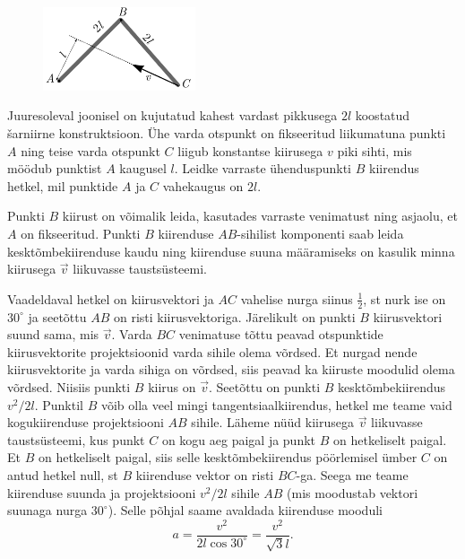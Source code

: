 
\begin{figure}
	\vspace{-10pt}
	\includegraphics[width = 0.4\textwidth] {2017-lahg-10-delta.pdf}
\end{figure}

Juuresoleval joonisel on kujutatud kahest vardast pikkusega $2l$ koostatud \v sarniirne konstruktsioon. Ühe varda otspunkt on fikseeritud liikumatuna punkti $A$ ning teise varda otspunkt $C$ liigub konstantse kiirusega $v$ piki sihti, mis möödub punktist $A$ kaugusel $l$. Leidke varraste ühenduspunkti $B$ kiirendus hetkel, mil punktide $A$ ja $C$ vahekaugus on $2l$.

\hint
Punkti $B$ kiirust on võimalik leida, kasutades varraste venimatust ning asjaolu, et $A$ on fikseeritud. Punkti $B$ kiirenduse $AB$-sihilist komponenti saab leida kesktõmbekiirenduse kaudu ning kiirenduse suuna määramiseks on kasulik minna kiirusega $\vec{v}$ liikuvasse taustsüsteemi.

\solu
Vaadeldaval hetkel on kiirusvektori ja $AC$ vahelise nurga siinus $\frac 12$, st nurk ise on $30^\circ$ ja seetõttu $AB$ on risti kiirusvektoriga. Järelikult on punkti $B$ kiirusvektori suund sama, mis $\vec v$. Varda $BC$ venimatuse tõttu peavad otspunktide kiirusvektorite projektsioonid varda sihile olema võrdsed. Et nurgad nende kiirusvektorite ja varda sihiga on võrdsed, siis peavad ka kiiruste moodulid olema võrdsed. Niisiis punkti $B$ kiirus on $\vec v$. Seetõttu on punkti $B$ kesktõmbekiirendus $v^2/2l$. Punktil $B$ võib olla veel mingi tangentsiaalkiirendus, hetkel me teame vaid kogukiirenduse projektsiooni $AB$ sihile. Läheme nüüd kiirusega $\vec v$ liikuvasse taustsüsteemi, kus punkt $C$ on kogu aeg paigal ja punkt $B$ on hetkeliselt paigal. Et $B$ on hetkeliselt paigal, siis selle kesktõmbekiirendus pöörlemisel ümber $C$ on antud hetkel null, st $B$ kiirenduse vektor on risti $BC$-ga. Seega me teame kiirenduse suunda ja projektsiooni $v^2/2l$ sihile $AB$ (mis moodustab vektori suunaga nurga $30^\circ$). Selle põhjal saame avaldada kiirenduse mooduli
\[
a=\frac{v^2}{2l\cos30^\circ}=\frac{v^2}{\sqrt 3l}.
\]


